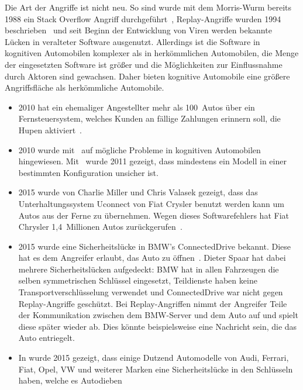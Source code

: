 Die Art der Angriffe ist nicht neu. So sind wurde mit dem Morris-Wurm bereits
1988 ein Stack Overflow Angriff durchgeführt~\cite{Seltzer2013},
Replay-Angriffe wurden 1994 beschrieben~\cite{Syverson1994} und seit Beginn
der Entwicklung von Viren werden bekannte Lücken in veralteter Software
ausgenutzt. Allerdings ist die Software in kognitiven Automobilen komplexer
als in herkömmlichen Automobilen, die Menge der eingesetzten Software ist
größer und die Möglichkeiten zur Einflussnahme durch Aktoren sind gewachsen.
Daher bieten kognitive Automobile eine größere Angriffsfläche als
herkömmliche Automobile.

\begin{itemize}
    \item 2010 hat ein ehemaliger Angestellter mehr als 100~Autos über ein
          Fernsteuersystem, welches Kunden an fällige Zahlungen erinnern soll,
          die Hupen aktiviert~\cite{Poulsen2010}.
    \item 2010 wurde mit~\cite{Koscher2010} auf mögliche Probleme in kognitiven
          Automobilen hingewiesen. Mit~\cite{Checkoway2011} wurde 2011 gezeigt,
          dass mindestens ein Modell in einer bestimmten Konfiguration unsicher
          ist.
    \item 2015 wurde von Charlie Miller und Chris Valasek gezeigt, dass das
          Unterhaltungssystem Uconnect von Fiat Crysler benutzt werden kann um
          Autos aus der Ferne zu übernehmen. Wegen dieses Softwarefehlers hat
          Fiat Chrysler 1,4~Millionen Autos zurückgerufen~\cite{Gallagher2015}.
    \item 2015 wurde eine Sicherheitslücke in BMW's ConnectedDrive bekannt.
          Diese hat es dem Angreifer erlaubt, das Auto zu
          öffnen~\cite{Spaar2015}. Dieter Spaar hat dabei mehrere
          Sicherheitslücken aufgedeckt: BMW hat in allen Fahrzeugen die selben
          symmetrischen Schlüssel eingesetzt, Teildienste haben keine
          Transportverschlüsselung verwendet und ConnectedDrive war nicht gegen
          Replay-Angriffe geschützt. Bei Replay-Angriffen nimmt der Angreifer
          Teile der Kommunikation zwischen dem BMW-Server und dem Auto auf und
          spielt diese später wieder ab. Dies könnte beispielsweise eine
          Nachricht sein, die das Auto entriegelt.
    \item In \cite{Verdult2015} wurde 2015 gezeigt, dass einige Dutzend
          Automodelle von Audi, Ferrari, Fiat, Opel, VW und weiterer Marken
          eine Sicherheitslücke in den Schlüsseln haben, welche es Autodieben

\end{itemize}

